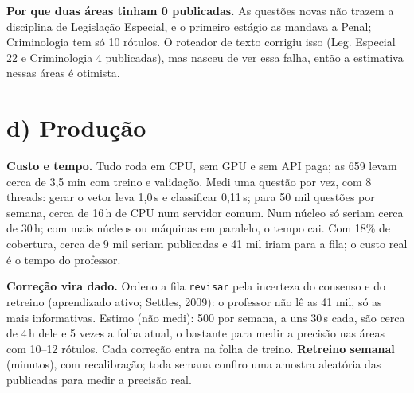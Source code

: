 \documentclass[12pt]{article}
\newcommand{\cod}[1]{\texttt{\small #1}}
\begin{document}
\textbf{Por que duas áreas tinham 0 publicadas.} As questões novas não trazem a disciplina de Legislação Especial, e o primeiro estágio as mandava a Penal; Criminologia tem só 10 rótulos. O roteador de texto corrigiu isso (Leg. Especial 22 e Criminologia 4 publicadas), mas nasceu de ver essa falha, então a estimativa nessas áreas é otimista.

\section*{d) Produção}
\textbf{Custo e tempo.} Tudo roda em CPU, sem GPU e sem API paga; as 659 levam cerca de 3,5 min com treino e validação. Medi uma questão por vez, com 8 threads: gerar o vetor leva 1,0\,s e classificar 0,11\,s; para 50 mil questões por semana, cerca de 16\,h de CPU num servidor comum. Num núcleo só seriam cerca de 30\,h; com mais núcleos ou máquinas em paralelo, o tempo cai. Com 18\% de cobertura, cerca de 9 mil seriam publicadas e 41 mil iriam para a fila; o custo real é o tempo do professor.

\begin{center}
\end{center}
\textbf{Correção vira dado.} Ordeno a fila \cod{revisar} pela incerteza do consenso e do retreino (aprendizado ativo; Settles, 2009): o professor não lê as 41 mil, só as mais informativas. Estimo (não medi): 500 por semana, a uns 30\,s cada, são cerca de 4\,h dele e 5 vezes a folha atual, o bastante para medir a precisão nas áreas com 10--12 rótulos. Cada correção entra na folha de treino. \textbf{Retreino semanal} (minutos), com recalibração; toda semana confiro uma amostra aleatória das publicadas para medir a precisão real.
\end{document}

